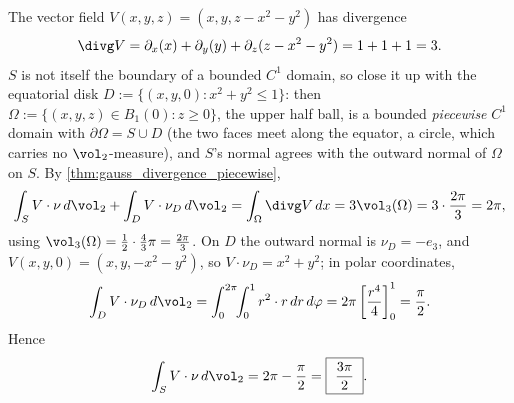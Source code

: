 \begin{exercisesolution}
\label{sol:vector_field_flux_hemisphere}
The vector field $V(x,y,z) = (x,y,z-x^2-y^2)$ has divergence
\[\divg V = \partial_x(x) + \partial_y(y) + \partial_z(z-x^2-y^2) = 1+1+1 = 3.\]
$S$ is not itself the boundary of a bounded $C^1$ domain, so close it up with the equatorial
disk $D := \{(x,y,0) : x^2+y^2\leq1\}$: then $\Omega := \{(x,y,z)\in B_1(0) : z\geq0\}$, the
upper half ball, is a bounded \emph{piecewise} $C^1$ domain with $\partial\Omega = S\cup D$ (the
two faces meet along the equator, a circle, which carries no $\vol_2$-measure), and $S$'s
 normal agrees with the outward normal of $\Omega$ on $S$. By
\cref{thm:gauss_divergence_piecewise},
\[\int_S V\cdot\nu\,d\vol_2 + \int_D V\cdot\nu_D\,d\vol_2 = \int_\Omega \divg V\,dx
  = 3\vol_3(\Omega) = 3\cdot\frac{2\pi}{3} = 2\pi,\]
using $\vol_3(\Omega) = \frac12\cdot\frac43\pi = \frac{2\pi}{3}$. On $D$ the outward normal is
$\nu_D = -e_3$, and $V(x,y,0) = (x,y,-x^2-y^2)$, so $V\cdot\nu_D = x^2+y^2$; in polar
coordinates,
\[\int_D V\cdot\nu_D\,d\vol_2 = \int_0^{2\pi}\!\!\int_0^1 r^2\cdot r\,dr\,d\varphi
  = 2\pi\left[\frac{r^4}{4}\right]_0^1 = \frac{\pi}{2}.\]
Hence
\[\int_S V\cdot\nu\,d\vol_2 = 2\pi - \frac{\pi}{2} = \boxed{\ \frac{3\pi}{2}\ }.\]
\end{exercisesolution}

